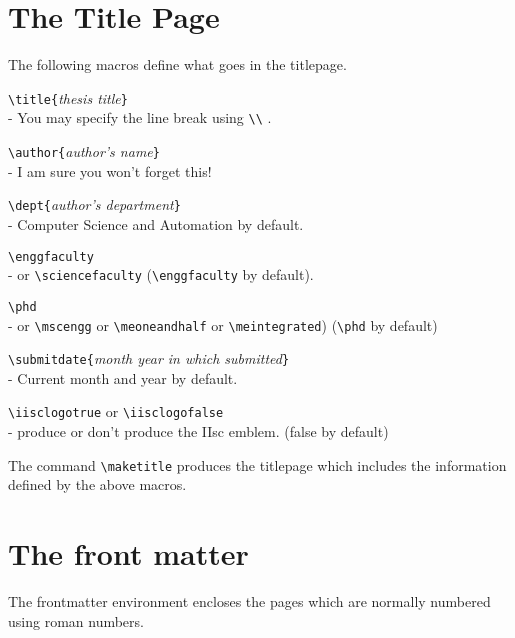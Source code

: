 \section{The Title Page}
The following macros define what goes in the titlepage.
\begin{description} 
	\item \verb|\title{|{\em thesis title}\verb|}| \\
		- You may specify the line break using \verb|\\| .
	\item \verb|\author{|{\em author's name}\verb|}|  \\
		- I am sure you won't forget this!
	\item \verb|\dept{|{\em author's department}\verb|}| \\ 
		- Computer Science and Automation by default.
	\item \verb|\enggfaculty| \\ 
		- or \verb|\sciencefaculty| (\verb|\enggfaculty| by default).
	\item \verb|\phd|  \\
		- or \verb|\mscengg| or \verb|\meoneandhalf| or \verb|\meintegrated|)
		  (\verb|\phd| by default)
	\item \verb|\submitdate{|{\em month year in which submitted}\verb|}|  \\
		- Current month and year by default.
	\item \verb|\iisclogotrue| or \verb|\iisclogofalse|  \\
		- produce or  don't produce the IIsc emblem. 
		  (false  by   default) \\
\end{description}

	The  command \verb|\maketitle| produces  the   titlepage which
includes the information defined by the above macros.

\section{The front matter}
	  The frontmatter
environment encloses the pages which are normally numbered using roman
numbers.


